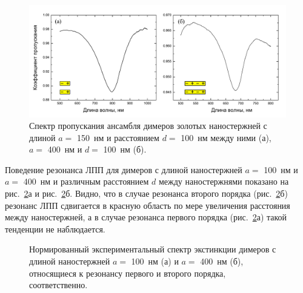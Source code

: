 \begin{figure}[!h]
\centering
\includegraphics[width=1\linewidth]{img/microspectroscopy/spectra_1-2res.pdf}
\caption{Спектр пропускания ансамбля димеров золотых наностержней с длиной $ a = $ 150~нм и расстоянием $ d = $  100~нм между ними (а), $ a = $ 400~нм и $ d = $ 100~нм (б).}
\label{img:spectra}
\end{figure}

Поведение резонанса ЛПП для димеров с длиной наностержней $ a = $ 100~нм и $ a = $ 400~нм и различным расстоянием $ d $ между наностержнями показано на рис.~\ref{img:extinction}а и рис.~\ref{img:extinction}б. Видно, что в случае резонанса второго порядка (рис.~\ref{img:extinction}б) резонанс ЛПП сдвигается в красную область по мере увеличения расстояния между наностержней, а в случае резонанса первого порядка (рис.~\ref{img:extinction}а) такой тенденции не наблюдается.
\begin{figure}
\caption{Нормированный экспериментальный спектр экстинкции димеров с длиной наностержней $ a = $ 100~нм (а) и $ a = $ 400~нм (б), относящиеся к резонансу первого и второго порядка, соответственно.}
\label{img:extinction}
\end{figure}


